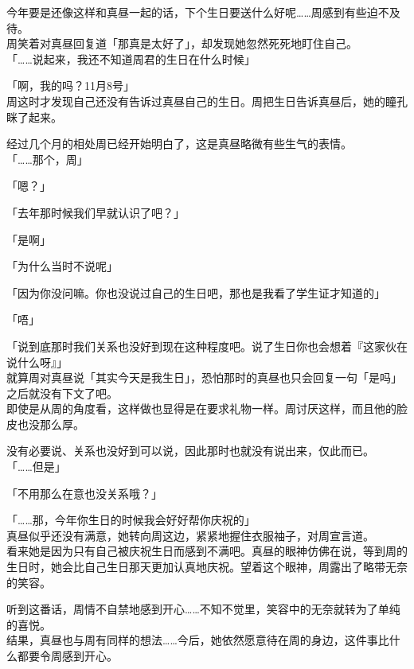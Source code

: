 今年要是还像这样和真昼一起的话，下个生日要送什么好呢……周感到有些迫不及待。\\

周笑着对真昼回复道「那真是太好了」，却发现她忽然死死地盯住自己。\\

「……说起来，我还不知道周君的生日在什么时候」

「啊，我的吗？11月8号」\\

周这时才发现自己还没有告诉过真昼自己的生日。周把生日告诉真昼后，她的瞳孔眯了起来。

经过几个月的相处周已经开始明白了，这是真昼略微有些生气的表情。\\

「……那个，周」

「嗯？」

「去年那时候我们早就认识了吧？」

「是啊」

「为什么当时不说呢」

「因为你没问嘛。你也没说过自己的生日吧，那也是我看了学生证才知道的」

「唔」

「说到底那时我们关系也没好到现在这种程度吧。说了生日你也会想着『这家伙在说什么呀』」\\

就算周对真昼说「其实今天是我生日」，恐怕那时的真昼也只会回复一句「是吗」之后就没有下文了吧。\\

即使是从周的角度看，这样做也显得是在要求礼物一样。周讨厌这样，而且他的脸皮也没那么厚。

没有必要说、关系也没好到可以说，因此那时也就没有说出来，仅此而已。\\

「……但是」

「不用那么在意也没关系哦？」

「……那，今年你生日的时候我会好好帮你庆祝的」\\

真昼似乎还没有满意，她转向周这边，紧紧地握住衣服袖子，对周宣言道。\\

看来她是因为只有自己被庆祝生日而感到不满吧。真昼的眼神仿佛在说，等到周的生日时，她会比自己生日那天更加认真地庆祝。望着这个眼神，周露出了略带无奈的笑容。

听到这番话，周情不自禁地感到开心……不知不觉里，笑容中的无奈就转为了单纯的喜悦。\\

结果，真昼也与周有同样的想法……今后，她依然愿意待在周的身边，这件事比什么都要令周感到开心。\\

